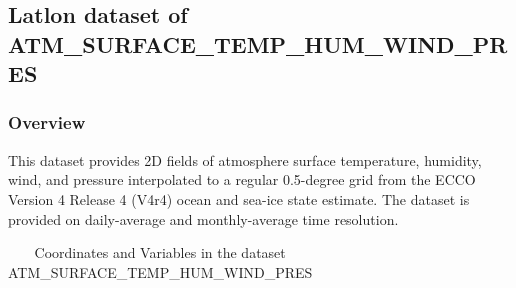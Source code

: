 \subsection{Latlon dataset of ATM\_SURFACE\_TEMP\_HUM\_WIND\_PRES}
\newp
\subsubsection{Overview}
This dataset provides 2D fields of atmosphere surface temperature, humidity, wind, and pressure interpolated to a regular 0.5-degree grid from the ECCO Version 4 Release 4 (V4r4) ocean and sea-ice state estimate. The dataset is provided on daily-average and monthly-average time resolution. 
\begin{longtable}{|m{}|m{}|m{}|}
\caption{Coordinates and Variables in the dataset ATM\_SURFACE\_TEMP\_HUM\_WIND\_PRES}
\label{tab:table-<xarray.Dataset> Size: 6MB
Dimensions:         (time: 1, latitude: 360, longitude: 720, nv: 2)
Coordinates:
  * time            (time) datetime64[ns] 8B 2017-12-29T12:00:00
  * latitude        (latitude) float32 1kB -89.75 -89.25 -88.75 ... 89.25 89.75
  * longitude       (longitude) float32 3kB -179.8 -179.2 -178.8 ... 179.2 179.8
    time_bnds       (time, nv) datetime64[ns] 16B ...
    latitude_bnds   (latitude, nv) float32 3kB ...
    longitude_bnds  (longitude, nv) float32 6kB ...
Dimensions without coordinates: nv
Data variables:
    EXFatemp        (time, latitude, longitude) float32 1MB ...
    EXFaqh          (time, latitude, longitude) float32 1MB ...
    EXFewind        (time, latitude, longitude) float32 1MB ...
    EXFnwind        (time, latitude, longitude) float32 1MB ...
    EXFwspee        (time, latitude, longitude) float32 1MB ...
    EXFpress        (time, latitude, longitude) float32 1MB ...
Attributes: (12/57)
    acknowledgement:              This research was carried out by the Jet Pr...
    author:                       Ian Fenty and Ou Wang
    cdm_data_type:                Grid
    comment:                      Fields provided on a regular lat-lon grid. ...
    Conventions:                  CF-1.8, ACDD-1.3
    coordinates_comment:          Note: the global 'coordinates' attribute de...
    ...                           ...
    time_coverage_duration:       P1D
    time_coverage_end:            2017-12-30T00:00:00
    time_coverage_resolution:     P1D
    time_coverage_start:          2017-12-29T00:00:00
    title:                        ECCO Atmosphere Surface Temperature, Humidi...
    uuid:                         ee4bbf50-4051-11eb-8ae0-0cc47a3f8727-fields} \\ 

\end{longtable}
